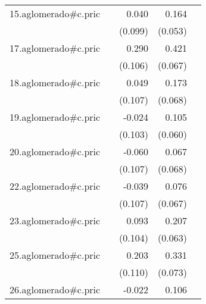 {\begin{longtable}{l*{4}{D{.}{.}{-1}}}
\addlinespace
15.aglomerado#c.pric&                     &       0.040         &       0.164\sym{**} &                     \\
            &                     &     (0.099)         &     (0.053)         &                     \\
\addlinespace
17.aglomerado#c.pric&                     &       0.290\sym{**} &       0.421\sym{***}&                     \\
            &                     &     (0.106)         &     (0.067)         &                     \\
\addlinespace
18.aglomerado#c.pric&                     &       0.049         &       0.173\sym{*}  &                     \\
            &                     &     (0.107)         &     (0.068)         &                     \\
\addlinespace
19.aglomerado#c.pric&                     &      -0.024         &       0.105         &                     \\
            &                     &     (0.103)         &     (0.060)         &                     \\
\addlinespace
20.aglomerado#c.pric&                     &      -0.060         &       0.067         &                     \\
            &                     &     (0.107)         &     (0.068)         &                     \\
\addlinespace
22.aglomerado#c.pric&                     &      -0.039         &       0.076         &                     \\
            &                     &     (0.107)         &     (0.067)         &                     \\
\addlinespace
23.aglomerado#c.pric&                     &       0.093         &       0.207\sym{**} &                     \\
            &                     &     (0.104)         &     (0.063)         &                     \\
\addlinespace
25.aglomerado#c.pric&                     &       0.203         &       0.331\sym{***}&                     \\
            &                     &     (0.110)         &     (0.073)         &                     \\
\addlinespace
26.aglomerado#c.pric&                     &      -0.022         &       0.106         &                     \\

\end{longtable}}

